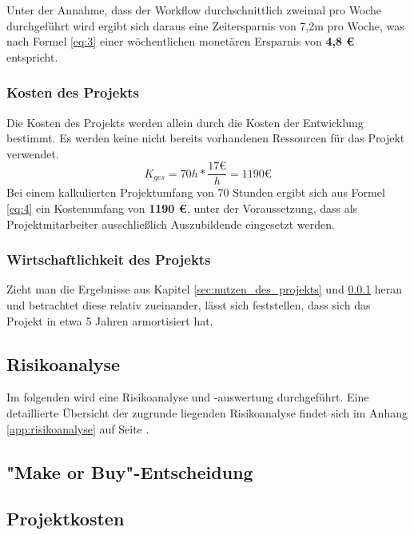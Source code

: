 \documentclass[12pt, xcolor=dvipsnames]{scrartcl}
\begin{document}
Unter der Annahme, dass der Workflow durchschnittlich zweimal pro Woche durchgeführt wird ergibt sich daraus eine Zeitersparnis von 7,2m pro Woche, was nach Formel \ref{eq:3} einer wöchentlichen monetären Ersparnis von \textbf{4,8 \euro{}} entspricht.


\subsubsection{Kosten des Projekts}
\label{sec:kosten_des_projekts}

Die Kosten des Projekts werden allein durch die Kosten der Entwicklung bestimmt. Es werden keine nicht bereits vorhandenen Ressourcen für das Projekt verwendet.
\begin{equation} \label{eq:4}
	K_{ges} = 70h * \frac{17 \euro}{h} = 1190 \euro
\end{equation}
Bei einem kalkulierten Projektumfang von 70 Stunden ergibt sich aus Formel \ref{eq:4} ein Kostenumfang von \textbf{1190 \euro{}}, unter der Voraussetzung, dass als Projektmitarbeiter ausschließlich Auszubildende eingesetzt werden.


\subsubsection{Wirtschaftlichkeit des Projekts}
Zieht man die Ergebnisse aus Kapitel \ref{sec:nutzen_des_projekts} und \ref{sec:kosten_des_projekts} heran und betrachtet diese relativ zueinander, lässt sich feststellen, dass sich das Projekt in etwa 5 Jahren armortisiert hat.


\subsection{Risikoanalyse}

Im folgenden wird eine Risikoanalyse und -auswertung durchgeführt.
Eine detaillierte Übersicht der zugrunde liegenden Risikoanalyse findet sich im Anhang \ref{app:risikoanalyse} auf Seite \pageref{app:risikoanalyse}.

\subsection{"Make or Buy"-Entscheidung}

\subsection{Projektkosten}
\end{document}
